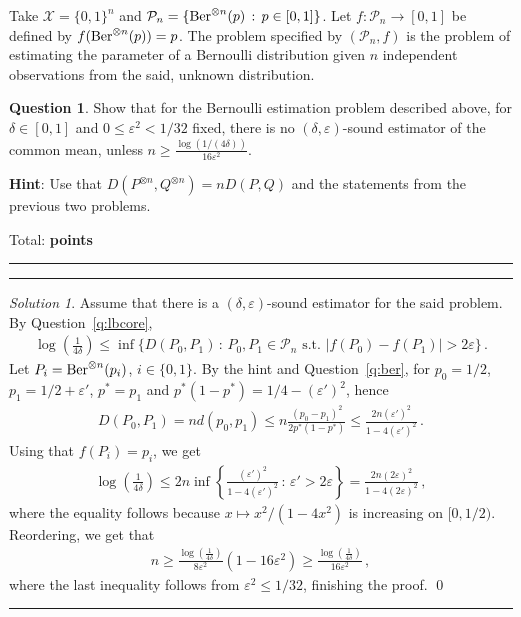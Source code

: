 \documentclass{article}
\newcommand{\cP}{\mathcal{P}}
\newcommand{\cX}{\mathcal{X}}
\DeclareMathOperator*{\1}{\mathbbm{1}}
\newcommand{\0}{\mathbf{0}}
\newcounter{DocPoints} %
\newcounter{QuestionPoints} %
\newcommand{\tpoints}[1]{        %
	\ifthenelse{\isempty{#1}}%
	{%
	}%
	{%
		\addtocounter{DocPoints}{#1}
		\addtocounter{QuestionPoints}{#1}
	}													 %
	\par\mbox{}\par\noindent\hfill {Total: \bf \arabic{QuestionPoints}\xspace points}\par\mbox{}\par\hrule\hrule
	\setcounter{QuestionPoints}{0}
}
\theoremstyle{definition}
\newtheorem{question}{Question}
\theoremstyle{remark}
\newtheorem*{solution*}{Solution}
\theoremstyle{theorem}
\newcommand{\hint}{\noindent \textbf{Hint}:\xspace}
\begin{document}
Take $\cX = \{0,1\}^n$ and $\cP_n = \{ \Ber^{\otimes n}(p) \,:\, p\in [0,1] \}$.
Let $f:\cP_n \to [0,1]$ be defined by $f(\text{Ber}^{\otimes n}(p)) = p$.
The problem specified by $(\cP_n,f)$ is the problem of estimating the parameter 
of a Bernoulli distribution given $n$ independent observations from the said, unknown distribution.

\begin{question}
Show that for the Bernoulli estimation problem described above,
for $\delta\in [0,1]$ and $0\le \varepsilon^2<1/32$ fixed, there is no $(\delta,\varepsilon)$-sound estimator
of the common mean, unless
 $n\ge \frac{\log(1/(4\delta))}{16 \varepsilon^2} $.
 
\hint Use that $D(P^{\otimes n},Q^{\otimes n}) = n D(P,Q)$ and the statements from the previous two problems.
\tpoints{20}
\end{question}
\begin{solution*}
Assume that there is a $(\delta,\varepsilon)$-sound estimator for the said problem.
By Question~\ref{q:lbcore},
\begin{align*}
\log\left(\frac{1}{4\delta}\right) \le \inf \{ D(P_0,P_1) \,:\, P_0,P_1\in \cP_n \text{ s.t. }
|f(P_0)-f(P_1)|>2\varepsilon \}\,.
\end{align*}
Let $P_i = \text{Ber}^{\otimes n}(p_i)$, $i\in \{0,1\}$.
By the hint and Question~\ref{q:ber}, for $p_0=1/2$, $p_1 = 1/2+\varepsilon'$, $p^* = p_1$ and $p^*(1-p^*) = 1/4-(\varepsilon')^2$, hence
\begin{align*}
D(P_0,P_1) = n d(p_0,p_1) \le n \frac{ (p_0-p_1)^2}{ 2p^*(1-p^*)} \le \frac{2 n (\varepsilon')^2}{1-4 (\varepsilon')^2}\,.
\end{align*}
Using that $f(P_i) = p_i$, we get 
\begin{align*}
\log\left(\frac{1}{4\delta}\right) 
\le 2n \inf \left\{ \frac{ (\varepsilon')^2}{1-4 (\varepsilon')^2} \,:\, \varepsilon'>2\varepsilon \right\}
= \frac{2 n (2\varepsilon)^2}{1-4 (2\varepsilon)^2}\,,
\end{align*}
where the equality follows because $x \mapsto x^2/(1-4x^2)$ is increasing on $[0,1/2)$.
Reordering, we get that
\begin{align*}
n 
\ge \frac{\log\left(\frac{1}{4\delta}\right) }{8\varepsilon^2} (1-16 \varepsilon^2)
\ge \frac{\log\left(\frac{1}{4\delta}\right) }{16\varepsilon^2} 
\,,
\end{align*}
where the last inequality follows from $\varepsilon^2\le 1/32$,
finishing the proof.
\qed\par\smallskip\hrule
\end{solution*}
\end{document}
